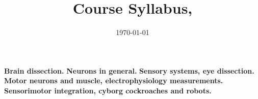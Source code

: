 \documentclass{exam}
\title{Course Syllabus, \mobeardCourseTerm}
\author{\mobeardInstructorShort}
\date{\today}
\begin{document}
\maketitle

\begin{questions}
\question \textbf{Brain dissection.} 
\question \textbf{Neurons in general.}
\question \textbf{Sensory systems, eye dissection.}
\question \textbf{Motor neurons and muscle, electrophysiology measurements.}
\question \textbf{Sensorimotor integration, cyborg cockroaches and robots.}
\end{questions}
\end{document}
